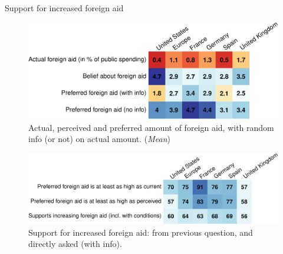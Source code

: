 \documentclass[aspectratio=169,xcolor=dvipsnames, 11pt,mathserif]{beamer}
\begin{document}
\begin{framefont}{\small}
\begin{frame}{Support for increased foreign aid \hyperlink{foreign_aid_conditions}{}\label{foreign_aid_perceptions}}\vspace{-.2cm} 
    \begin{figure} 
        \centering 
        \caption{Actual, perceived and preferred amount of foreign aid, with random info (or not) on actual amount. (\textit{Mean})}\vspace{-.2cm}
        \includegraphics[height=.4\textheight]{../figures/country_comparison/foreign_aid_amount_mean.pdf} %
    \end{figure}\vspace{-.2cm}\pause
    \begin{figure} 
        \centering 
        \caption{Support for increased foreign aid: from previous question, and directly asked (with info).}\vspace{-.2cm}
        \includegraphics[height=.32\textheight]{../figures/country_comparison/foreign_aid_no_less_positive.pdf} 
    \end{figure} \vspace{-.1cm}
	\quad \quad \quad \quad \quad \quad {} \quad \quad \quad {}
\end{frame}


\end{framefont}
\end{document}

